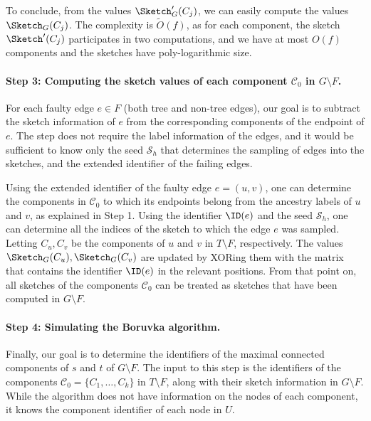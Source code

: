 To conclude, from the values $\Sketch'_G(C_j)$, we can easily compute the values $\Sketch_G(C_j)$. The complexity is $\tilde{O}(f)$, as for each component, the sketch $\Sketch'(C_j)$ participates in two computations, and we have at most $O(f)$ components and the sketches have poly-logarithmic size.


\paragraph{Step 3: Computing the sketch values of each component $\mathcal{C}_0$ in $G \setminus F$.} 
For each faulty edge $e \in F$ (both tree and non-tree edges), our goal is to subtract the sketch information of $e$ from the corresponding components of the endpoint of $e$. The step does not require the label information of the edges, and it would be sufficient to know only the seed $\mathcal{S}_h$ that determines the sampling of edges into the sketches, and the extended identifier of the failing edges. 

Using the extended identifier of the faulty edge $e=(u,v)$, one can determine the components in $\mathcal{C}_0$ to which its endpoints belong from the ancestry labels of $u$ and $v$, as explained in Step 1. Using the identifier $\ID(e)$ and the seed $\mathcal{S}_h$, one can determine all the indices of the sketch to which the edge $e$ was sampled. 
Letting $C_u, C_v$ be the components of $u$ and $v$ in $T \setminus F$, respectively. The values $\Sketch_G(C_u),\Sketch_G(C_v)$ are updated by XORing them with the matrix that contains the identifier $\ID(e)$ in the relevant positions. 
From that point on, all sketches of the components $\mathcal{C}_0$ can be treated as sketches that have been computed in $G \setminus F$.  


\paragraph{Step 4: Simulating the Boruvka algorithm.} Finally, our goal is to determine the identifiers of the maximal connected components of $s$ and $t$ of $G \setminus F$. The input to this step is the identifiers of the components $\mathcal{C}_0=\{C_{1}, \ldots, C_k\}$ in $T \setminus F$, along with their sketch information in $G \setminus F$. While the algorithm does not have information on the nodes of each component, it knows the component identifier of each node in $U$. 

